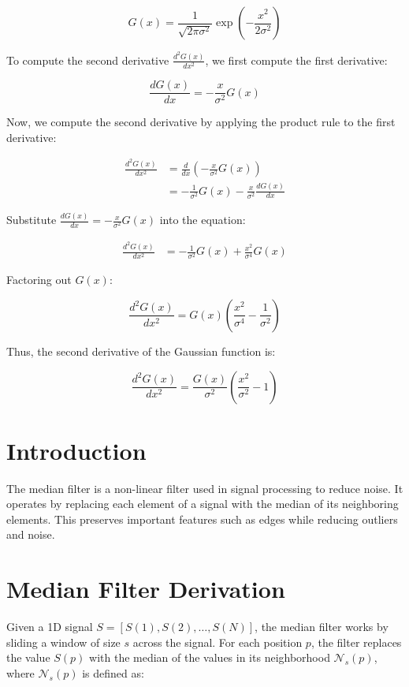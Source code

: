 \documentclass{article}
\begin{document}
\begin{equation}
G(x) = \frac{1}{\sqrt{2\pi\sigma^2}} \exp\left( -\frac{x^2}{2\sigma^2} \right)
\end{equation}

To compute the second derivative \( \frac{d^2G(x)}{dx^2} \), we first compute the first derivative:

\begin{equation}
\frac{dG(x)}{dx} = -\frac{x}{\sigma^2} G(x)
\end{equation}

Now, we compute the second derivative by applying the product rule to the first derivative:

\begin{align}
\frac{d^2 G(x)}{dx^2} &= \frac{d}{dx} \left( -\frac{x}{\sigma^2} G(x) \right) \nonumber \\
&= -\frac{1}{\sigma^2} G(x) - \frac{x}{\sigma^2} \frac{dG(x)}{dx}
\end{align}

Substitute \( \frac{dG(x)}{dx} = -\frac{x}{\sigma^2} G(x) \) into the equation:

\begin{align}
\frac{d^2 G(x)}{dx^2} &= -\frac{1}{\sigma^2} G(x) + \frac{x^2}{\sigma^4} G(x)
\end{align}

Factoring out \( G(x) \):

\begin{equation}
\frac{d^2 G(x)}{dx^2} = G(x) \left( \frac{x^2}{\sigma^4} - \frac{1}{\sigma^2} \right)
\end{equation}

Thus, the second derivative of the Gaussian function is:

\begin{equation}
\frac{d^2G(x)}{dx^2} = \frac{G(x)}{\sigma^2} \left( \frac{x^2}{\sigma^2} - 1 \right)
\end{equation}


\section{Introduction}
The median filter is a non-linear filter used in signal processing to reduce noise. It operates by replacing each element of a signal with the median of its neighboring elements. This preserves important features such as edges while reducing outliers and noise.

\section{Median Filter Derivation}
Given a 1D signal \( S = [S(1), S(2), \dots, S(N)] \), the median filter works by sliding a window of size \( s \) across the signal. For each position \( p \), the filter replaces the value \( S(p) \) with the median of the values in its neighborhood \( \mathcal{N}_s(p) \), where \( \mathcal{N}_s(p) \) is defined as:
\end{document}
